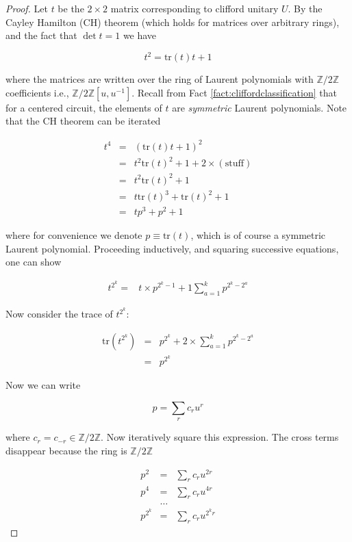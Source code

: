 \documentclass[aps,prb,twocolumn,superscriptaddress]{revtex4-1}
\begin{document}
\begin{proof}
Let $t$ be the $2\times2$ matrix corresponding to clifford unitary
$U$. By the Cayley Hamilton (CH) theorem (which holds for matrices
over arbitrary rings), and the fact that $\det t=1$ we have

\[
t^{2}=\text{tr}\left(t\right)t+1
\]


where the matrices are written over the ring of Laurent polynomials
with $\mathbb{Z}/2\mathbb{Z}$ coefficients i.e., $\mathbb{Z}/2\mathbb{Z}\left[u,u^{-1}\right]$.
Recall from Fact \ref{fact:cliffordclassification} that
for a centered circuit, the elements of $t$ are \emph{symmetric}
Laurent polynomials. Note that the CH theorem can be iterated

\begin{eqnarray*}
t^{4} & = & \left(\text{tr}\left(t\right)t+1\right)^{2}\\
 & = & t^{2}\text{tr}\left(t\right)^{2}+1+2\times(\text{stuff})\\
 & = & t^{2}\text{tr}\left(t\right)^{2}+1\\
 & = & t\text{tr}\left(t\right)^{3}+\text{tr}\left(t\right)^{2}+1\\
 & = & tp^{3}+p^{2}+1
\end{eqnarray*}


where for convenience we denote $p\equiv\text{tr}\left(t\right)$,
which is of course a symmetric Laurent polynomial. Proceeding inductively,
and squaring successive equations, one can show

\begin{align*}
t^{2^{k}}= & t\times p{}^{2^{k}-1}+1\sum_{a=1}^{k}p^{2^{k}-2^{a}}
\end{align*}


Now consider the trace of $t^{2^{k}}$:

\begin{eqnarray*}
\text{tr}\left(t^{2^{k}}\right) & = & p{}^{2^{k}}+2\times\sum_{a=1}^{k}p^{2^{k}-2^{a}}\\
 & = & p^{2^{k}}
\end{eqnarray*}


Now we can write

\[
p=\sum_{r}c_{r}u^{r}
\]


where $c_{r}=c_{-r}\in\mathbb{Z}/2\mathbb{Z}$. Now iteratively square
this expression. The cross terms disappear because the ring is $\mathbb{Z}/2\mathbb{Z}$

\begin{eqnarray*}
p^{2} & = & \sum_{r}c_{r}u^{2r}\\
p^{4} & = & \sum_{r}c_{r}u^{4r}\\
 & \ldots\\
p^{2^{k}} & = & \sum_{r}c_{r}u^{2^{k}r}
\end{eqnarray*}



\end{proof}
\end{document}

